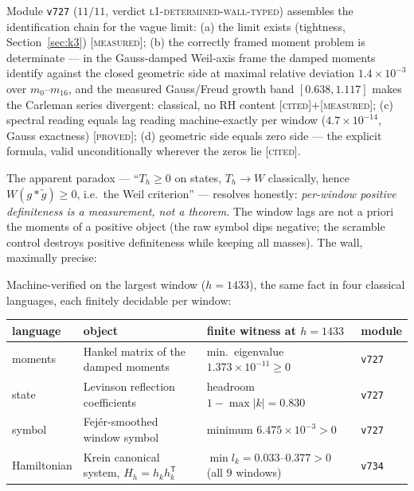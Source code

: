 \documentclass[11pt,a4paper]{article}
\theoremstyle{remark}
\newcommand{\PROVED}{\textnormal{[\textsc{proved}]}}
\newcommand{\MEASURED}{\textnormal{[\textsc{measured}]}}
\newcommand{\CITED}{\textnormal{[\textsc{cited}]}}
\begin{document}
Module \texttt{v727} ($11/11$, verdict
\textsc{l1-determined-wall-typed}) assembles the identification
chain for the vague limit: (a) the limit exists (tightness,
Section~\ref{sec:k3}) \MEASURED; (b) the correctly framed moment
problem is determinate --- in the Gauss-damped Weil-axis frame the
damped moments identify against the closed geometric side at maximal
relative deviation $1.4\times10^{-3}$ over $m_0$--$m_{16}$, and the
measured Gauss/Freud growth band $[0.638,1.117]$ makes the Carleman
series divergent: classical, no RH content \CITED$+$\MEASURED;
(c) spectral reading equals lag reading machine-exactly per window
($4.7\times10^{-14}$, Gauss exactness) \PROVED; (d) geometric side
equals zero side --- the explicit formula, valid unconditionally
wherever the zeros lie \CITED.

The apparent paradox --- ``$T_h\ge0$ on states, $T_h\to W$
classically, hence $W(g*\tilde g)\ge0$, i.e.\ the Weil criterion''
--- resolves honestly: \emph{per-window positive definiteness is a
measurement, not a theorem}.  The window lags are not a priori the
moments of a positive object (the raw symbol dips negative; the
scramble control destroys positive definiteness while keeping all
masses).  The wall, maximally precise:
\begin{center}
\end{center}
Machine-verified on the largest window ($h=1433$), the same fact in
four classical languages, each finitely decidable per window:
\begin{center}
\footnotesize
\setlength{\tabcolsep}{4pt}
\begin{tabular}{@{}llll@{}}
\toprule
language & object & finite witness at $h=1433$ & module\\
\midrule
moments & Hankel matrix of the damped moments &
min.\ eigenvalue $1.373\times10^{-11}\ge0$ & \texttt{v727}\\
state & Levinson reflection coefficients &
headroom $1-\max|k|=0.830$ & \texttt{v727}\\
symbol & Fej\'er-smoothed window symbol &
minimum $6.475\times10^{-3}>0$ & \texttt{v727}\\
Hamiltonian & Krein canonical system, $H_h=h_kh_k^{\mathsf T}$ &
$\min l_k=0.033$--$0.377>0$ (all $9$ windows) & \texttt{v734}\\
\bottomrule
\end{tabular}
\end{center}
\end{document}
